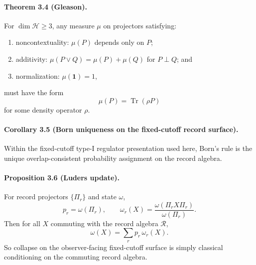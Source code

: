 \paragraph{\textbf{Theorem 3.4 (Gleason).}}
For \(\dim \mathcal H\ge 3\), any measure \(\mu\) on projectors satisfying:
\begin{enumerate}[leftmargin=2em]
\item noncontextuality: \(\mu(P)\) depends only on \(P\);
\item additivity: \(\mu(P\vee Q)=\mu(P)+\mu(Q)\) for \(P\perp Q\); and
\item normalization: \(\mu(\mathbf 1)=1\),
\end{enumerate}
must have the form
\[
\mu(P)=\operatorname{Tr}(\rho P)
\]
for some density operator \(\rho\).

\paragraph{\textbf{Corollary 3.5 (Born uniqueness on the fixed-cutoff record surface).}}
Within the fixed-cutoff type-I regulator presentation used here, Born's rule is the unique
overlap-consistent probability assignment on the record algebra.

\paragraph{\textbf{Proposition 3.6 (Luders update).}}
For record projectors \(\{\Pi_r\}\) and state \(\omega\),
\[
p_r=\omega(\Pi_r),
\qquad
\omega_r(X)=\frac{\omega(\Pi_r X \Pi_r)}{\omega(\Pi_r)}.
\]
Then for all \(X\) commuting with the record algebra \(\mathcal R\),
\[
\omega(X)=\sum_r p_r\,\omega_r(X).
\]
So collapse on the observer-facing fixed-cutoff surface is simply classical conditioning on the
commuting record algebra.
